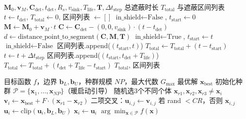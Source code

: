 \documentclass[12pt,a4paper]{ctexart}
\begin{document}
\begin{algorithm}[H]
\caption{遮蔽时长计算算法}
\begin{algorithmic}[1]
\Require $\mathbf{M}_0, \mathbf{v}_M, \mathbf{C}_{\text{det}}, t_{\text{det}}, R_s, v_{\text{sink}}, T_{\text{life}}, \mathbf{T}, \Delta t_{\text{step}}$
\Ensure 总遮蔽时长 $T_{\text{total}}$ 与遮蔽区间列表
\State $t \gets t_{\text{det}}$, $T_{\text{total}} \gets 0$, 区间列表 $\gets []$
\State $\text{in\_shield} \gets \text{False}$, $t_{\text{start}} \gets 0$
    \State $\mathbf{M} \gets \mathbf{M}_0 + \mathbf{v}_M \cdot t$
    \State $\mathbf{C} \gets \mathbf{C}_{\text{det}} - (0,0,v_{\text{sink}}) \cdot (t-t_{\text{det}})$
    \State $d \gets \text{distance\_point\_to\_segment}(\mathbf{C}, \mathbf{M}, \mathbf{T})$
        \State $\text{in\_shield} \gets \text{True}$, $t_{\text{start}} \gets t$
        \State $\text{in\_shield} \gets \text{False}$
        \State 区间列表.append($(t_{\text{start}}, t)$)
        \State $T_{\text{total}} \gets T_{\text{total}} + (t - t_{\text{start}})$
    \EndIf
    \State $t \gets t + \Delta t_{\text{step}}$
\EndWhile
{}
    \State 区间列表.append($(t_{\text{start}}, t_{\text{det}}+T_{\text{life}})$)
    \State $T_{\text{total}} \gets T_{\text{total}} + (t_{\text{det}}+T_{\text{life}} - t_{\text{start}})$
\EndIf
\State \Return $T_{\text{total}}$, 区间列表
\end{algorithmic}
\end{algorithm}

\begin{algorithm}[H]
\caption{差分进化算法（DE/best/1/bin）}
\begin{algorithmic}[1]
\Require 目标函数 $f$，边界 $\mathbf{b}_L, \mathbf{b}_U$，种群规模 $NP$，最大代数 $G_{\max}$
\Ensure 最优解 $\mathbf{x}_{\text{best}}$
\State 初始化种群 $\mathcal{P} = \{\mathbf{x}_1, \dots, \mathbf{x}_{NP}\}$（暖启动引导）
        \State 随机选3个不同个体 $\mathbf{x}_{r1},\mathbf{x}_{r2},\mathbf{x}_{r3}\neq\mathbf{x}_i$
        \State $\mathbf{v}_i \gets \mathbf{x}_{\text{best}} + F\cdot(\mathbf{x}_{r1}-\mathbf{x}_{r2})$ 
        \State 二项交叉：$\mathbf{u}_{i,j}\gets\mathbf{v}_{i,j}$ 若 rand $<CR$，否则 $\mathbf{x}_{i,j}$
        \State $\mathbf{u}_i \gets \text{clip}(\mathbf{u}_i, \mathbf{b}_L, \mathbf{b}_U)$
         $\mathbf{x}_i \gets \mathbf{u}_i$ \EndIf
    \EndFor
\EndFor
\State \Return $\arg\min_{\mathbf{x}\in\mathcal{P}} f(\mathbf{x})$
\end{algorithmic}
\end{algorithm}
\end{document}
